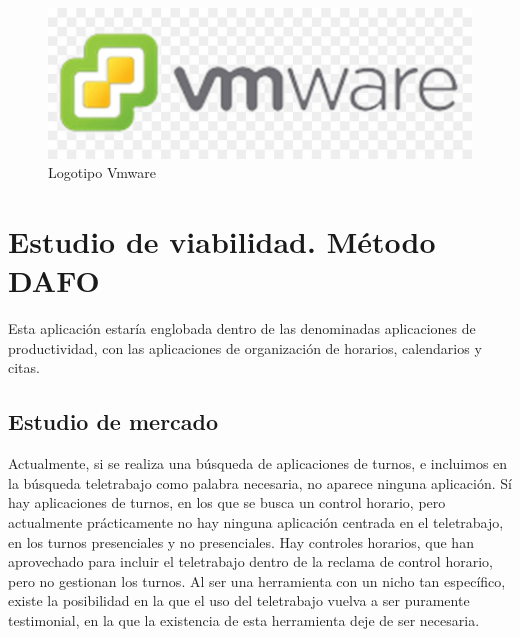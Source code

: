 \documentclass[11pt,spanish,listoffigures,listoftables]{tfgetsinf}
\begin{document}
\begin{figure}[!htb]
   \endminipage\hfill
     \includegraphics[width=\linewidth]{img/logo-vmware.jpg}
     \caption{Logotipo Vmware}\label{fig:LogoVmware}
   \endminipage
\end{figure}




\chapter{Estudio de viabilidad. Método DAFO}

Esta aplicación estaría englobada dentro de las denominadas aplicaciones de productividad, con las aplicaciones de organización de horarios, calendarios y citas.

\section{Estudio de mercado}

Actualmente, si se realiza una búsqueda de aplicaciones de turnos, e incluimos en la búsqueda teletrabajo como palabra necesaria, no aparece ninguna aplicación. 
Sí hay aplicaciones de turnos, en los que se busca un control horario, pero actualmente prácticamente no hay ninguna aplicación centrada en el teletrabajo, en los turnos presenciales y no presenciales.
Hay controles horarios, que han aprovechado para incluir el teletrabajo dentro de la reclama de control horario, pero no gestionan los turnos.
Al ser una herramienta con un nicho tan específico, existe la posibilidad en la que el uso del teletrabajo vuelva a ser puramente testimonial, en la que la existencia de esta herramienta deje de ser necesaria.
\end{document}
